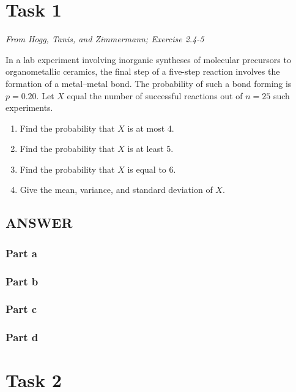\documentclass[
  letterpaper,
  DIV=11,
  numbers=noendperiod]{scrartcl}
\providecommand{\tightlist}{%
  \setlength{\itemsep}{0pt}\setlength{\parskip}{0pt}}
\begin{document}
\section{Task 1}\label{task-1}

\emph{From Hogg, Tanis, and Zimmermann; Exercise 2.4-5}

In a lab experiment involving inorganic syntheses of molecular
precursors to organometallic ceramics, the final step of a five-step
reaction involves the formation of a metal--metal bond. The probability
of such a bond forming is \(p = 0.20\). Let \(X\) equal the number of
successful reactions out of \(n = 25\) such experiments.

\begin{enumerate}
\def\labelenumi{\alph{enumi}.}
\tightlist
\item
  Find the probability that \(X\) is at most 4.
\item
  Find the probability that \(X\) is at least 5.
\item
  Find the probability that \(X\) is equal to 6.
\item
  Give the mean, variance, and standard deviation of \(X\).
\end{enumerate}

\subsection{ANSWER}\label{answer-1}

\subsubsection{Part a}\label{part-a-1}

\subsubsection{Part b}\label{part-b-1}

\subsubsection{Part c}\label{part-c-1}

\subsubsection{Part d}\label{part-d}

\section{Task 2}\label{task-2}
\end{document}

